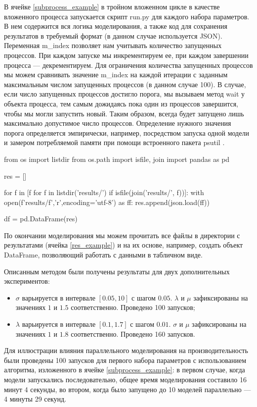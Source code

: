 В ячейке \ref{subprocess_example} в тройном вложенном цикле в качестве вложенного процесса запускается скрипт run.py для каждого набора параметров. В нем содержится вся логика моделирования, а также код для сохранения результатов в требуемый формат (в данном случае используется JSON). Переменная m\_index позволяет нам учитывать количество запущенных процессов. При каждом запуске мы инкрементируем ее, при каждом завершении процесса --- декрементируем. Для ограничения количества запущенных процессов мы можем сравнивать значение m\_index на каждой итерации с заданным максимальным числом запущенных процессов (в данном случае 100). В случае, если число запущенных процессов достигло порога, мы вызываем метод wait у объекта процесса, тем самым дожидаясь пока один из процессов завершится, чтобы мы могли запустить новый. Таким образом, всегда будет запущено лишь максимально допустимое число процессов. Определение нужного значения порога определяется эмпирически, например, посредством запуска одной модели и замером потребляемой памяти при помощи встроенного пакета psutil \cite{psutil}.


\begin{pyin}  
from os import listdir
from os.path import isfile, join
import pandas as pd

res = []

for f in [f for f in listdir('results/') if isfile(join('results/', f))]:
   with open(f'results/{f}','r',encoding='utf-8') as ff:
   res.append(json.load(ff))

df = pd.DataFrame(res)
\end{pyin}

По окончании моделирования мы можем прочитать все файлы в директории с результатами (ячейка \ref{res_example}) и на их основе, например, создать объект DataFrame, позволяющий работать с данными в табличном виде.

Описанным методом были получены результаты для двух дополнительных экспериментов:
\begin{itemize}
	\item $\sigma$ варьируется в интервале $[0.05,10]$ с шагом $0.05$. $\lambda$ и $\mu$ зафиксированы на значениях $1$ и $1.5$ соответственно. Проведено 100 запусков;
	\item $\lambda$ варьируется в интервале $[0.1,1.7]$ с шагом $0.01$. $\sigma$ и $\mu$ зафиксированы на значениях $1$ и $1.8$ соответственно. Проведено 160 запусков.
\end{itemize}

Для иллюстрации влияния параллельного моделирования на производительность были проведены 100 запусков для первого набора параметров с использованием алгоритма, изложенного в ячейке \ref{subprocess_example}: в первом случае, когда модели запускались последовательно, общее время моделирования составило 16 минут 4 секунды, во втором, когда было запущено до 10 моделей параллельно --- 4 минуты 29 секунд. 

